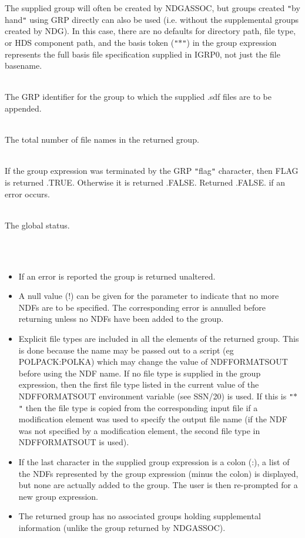 \documentclass[twoside,11pt]{article}
\newcommand{\xref}[3]{#1}
\renewcommand{\_}{\texttt{\symbol{95}}}
\newcommand{\sstsubsection}[1]{ \item[{#1}] \mbox{} \\}
\newcommand{\sstnotes}[1]{\item[Notes:] \mbox{} \\[1.3ex] #1}
\newcommand{\sstitemlist}[1]{
  \mbox{} \\
  \vspace{-3.5ex}
  \begin{itemize}
     #1
  \end{itemize}
}
\newcommand{\sstitem}{\item}
\newcommand{\sstsubsection}[1]{\item[{#1}]}
\newcommand{\sstnotes}[1]{\item[Notes:] #1 }
\newcommand{\sstitemlist}[1]{
      \begin{itemize}
         #1
      \end{itemize}
      \\
   }
\newcommand{\sstitem}{\item}
\begin{document}
{{{{         }
         The supplied group will often be created by NDG\_ASSOC, but
         groups created {\tt "}by hand{\tt "} using GRP directly can also be used
         (i.e. without the supplemental groups created by NDG). In
         this case, there are no defaults for directory path, file type,
         or HDS component path, and the basis token ({\tt "}$*${\tt "}) in the group
         expression represents the full basis file specification supplied
         in IGRP0, not just the file basename.
      }
      \sstsubsection{
         IGRP = INTEGER (Given and Returned)
      }{
         The GRP identifier for the group to which the supplied .sdf
         files are to be appended.
      }
      \sstsubsection{
         SIZE = INTEGER (Returned)
      }{
         The total number of file names in the returned group.
      }
      \sstsubsection{
         FLAG = LOGICAL (Returned)
      }{
         If the group expression was terminated by the GRP {\tt "}flag{\tt "}
         character, then FLAG is returned .TRUE. Otherwise it is
         returned .FALSE. Returned .FALSE. if an error occurs.
      }
      \sstsubsection{
         STATUS = INTEGER (Given and Returned)
      }{
         The global status.
      }
   }
   \sstnotes{
      \sstitemlist{

         \sstitem
         If an error is reported the group is returned unaltered.

         \sstitem
         A null value (!) can be given for the parameter to indicate
         that no more NDFs are to be specified. The corresponding error
         is annulled before returning unless no NDFs have been added to
         the group.

         \sstitem
         Explicit file types are included in all the elements of the returned
         group. This is done because the name may be passed out to a script (eg
         POLPACK:POLKA) which may change the value of NDF\_FORMATS\_OUT before
         using the NDF name. If no file type is supplied in the group
         expression, then the first file type listed in the current value of
         the NDF\_FORMATS\_OUT environment variable (see \xref{SSN/20}{ssn20}{}) is used. If
         this is {\tt "}$*${\tt "} then the file type is copied from the corresponding input
         file if a modification element was used to specify the output file
         name (if the NDF was not specified by a modification element, the
         second file type in NDF\_FORMATS\_OUT is used).

         \sstitem
         If the last character in the supplied group expression is
         a colon (:), a list of the NDFs represented by the group
         expression (minus the colon) is displayed, but none are
         actually added to the group. The user is then re-prompted for
         a new group expression.

         \sstitem
         The returned group has no associated groups holding supplemental
         information (unlike the group returned by NDG\_ASSOC).
      }
   }
}
\end{document}
